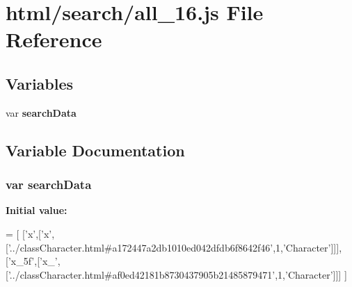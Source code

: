 \section{html/search/all\-\_\-16.js File Reference}
\label{all__16_8js}
\subsection*{Variables}
\begin{DoxyCompactItemize}
\item 
var {\bf search\-Data}
\end{DoxyCompactItemize}


\subsection{Variable Documentation}
\subsubsection[{search\-Data}]{\setlength{\rightskip}{0pt plus 5cm}var search\-Data}\label{all__16_8js_ad01a7523f103d6242ef9b0451861231e}
{\bfseries Initial value\-:}
\begin{DoxyCode}
=
[
  [\textcolor{charliteral}{'x'},[\textcolor{charliteral}{'x'},[\textcolor{stringliteral}{'../classCharacter.html#a172447a2db1010ed042dfdb6f8642f46'},1,\textcolor{stringliteral}{'Character'}]]],
  [\textcolor{stringliteral}{'x\_5f'},[\textcolor{stringliteral}{'x\_'},[\textcolor{stringliteral}{'../classCharacter.html#af0ed42181b8730437905b21485879471'},1,\textcolor{stringliteral}{'Character'}]]]
]
\end{DoxyCode}
